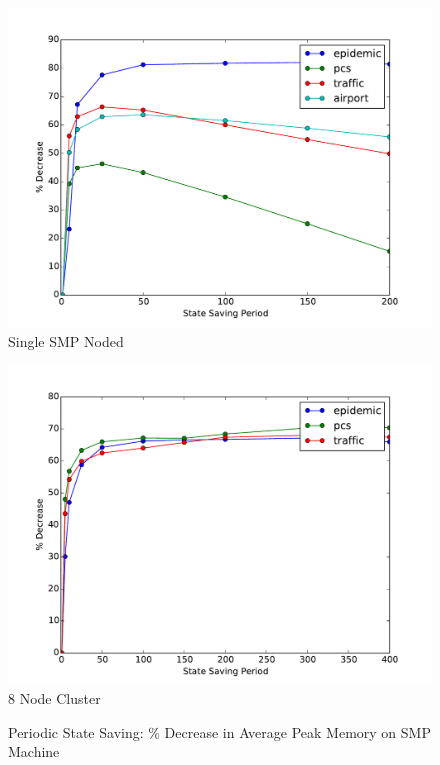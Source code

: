\documentclass[11pt]{book}
\begin{document}
\begin{figure}
  \begin{minipage}{.5\textwidth}
    \begin{center}
      \includegraphics[width=\textwidth,keepaspectratio,quiet]{figs/state_saving/bc/percent_memory_decrease.pdf} \\
      Single SMP Noded \\
    \end{center}
  \end{minipage}%
  \hfill
  \begin{minipage}{.5\textwidth}
    \begin{center}
      \includegraphics[width=\textwidth,keepaspectratio,quiet]{figs/state_saving/beowulf/percent_memory_decrease.pdf} \\
      8 Node Cluster
    \end{center}
  \end{minipage}
  \caption{Periodic State Saving: \% Decrease in Average Peak Memory on SMP Machine}\label{ssp_analysis_smp_memory}
\end{figure}
\end{document}
